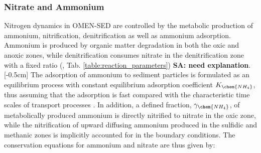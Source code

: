 \documentclass[gmd, manuscript]{copernicus}
\begin{document}
\subsubsection{Nitrate and Ammonium}\label{subsubsec:N}
Nitrogen dynamics in OMEN-SED are controlled by the metabolic production of ammonium, nitrification, denitrification as well as ammonium adsorption. 
Ammonium is produced by organic matter degradation in both the oxic and anoxic zones, while denitrification consumes nitrate in the denitrification zone with a fixed  ratio (, Tab. \ref{table:reaction_parameters}) \textbf{SA: need explanation}. 
[-0.5cm]%
The adsorption of ammonium to sediment particles is formulated as an equilibrium process with constant equilibrium adsorption coefficient $K_\chem{NH_4}$, thus assuming that the adsorption is fast compared with the 
characteristic time scales of transport processes \citep{wang_multicomponent_1996}. In addition, a defined fraction, $\gamma_{\chem{NH_4}}$, of metabolically produced ammonium is directly nitrified to nitrate in the oxic zone, 
while the nitrification of upward diffusing ammonium produced in the sulfidic and methanic zones is implicitly accounted for in the boundary conditions. The conservation equations for ammonium and nitrate are thus given by:
\end{document}
